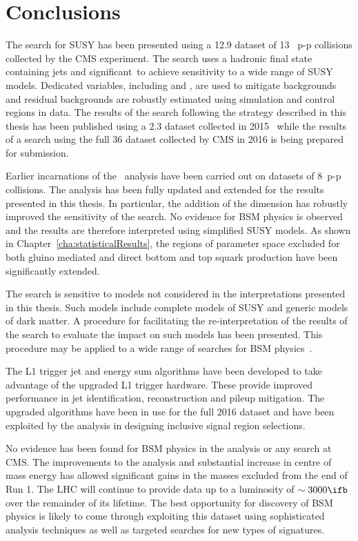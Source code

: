 \chapter{Conclusions}

The \alphat search for SUSY has been presented using a 12.9 \ifb 
dataset of 13 \TeV~p-p collisions collected by the CMS experiment. 
The search uses a hadronic final state containing jets and 
significant~\met to achieve sensitivity to a wide range of SUSY
models. Dedicated variables, including \alphat and \bdphi, are used 
to mitigate backgrounds and residual backgrounds 
are robustly estimated using simulation and control regions in data.
The results of the \alphat search following the strategy
described in this thesis has been published using 
a 2.3 \ifb dataset collected in 2015~\cite{alphat2015} while the results 
of a search using the full 36 \ifb dataset collected by CMS in 2016 
is being prepared for submission.

Earlier incarnations of the \alphat~analysis have been carried out
on datasets of 8\TeV~p-p collisions. The analysis has been
fully updated and extended for the results presented in this thesis. 
In particular, the addition of the \mht dimension has robustly improved the sensitivity of the search. 
No evidence for BSM physics is observed and the results are 
therefore interpreted using simplified SUSY models. As shown in Chapter~\ref{cha:statisticalResults},
the regions of parameter space excluded for both gluino mediated 
and direct bottom and top squark production have been 
significantly extended.

The \alphat search is sensitive to models not considered in the
interpretations presented in this thesis. Such models include 
complete models of SUSY and generic models of dark matter. 
A procedure for facilitating the re-interpretation of the results of the search to evaluate the 
impact on such models has been presented. This procedure 
may be applied to a wide range of searches for BSM physics~\cite{simp-lik}.

The L1 trigger jet and energy sum algorithms have been
developed to take advantage of the upgraded L1 trigger hardware.
These provide improved performance in jet identification, 
reconstruction and pileup mitigation. The upgraded algorithms have
been in use for the full 2016 dataset and have been exploited
by the \alphat analysis in designing inclusive signal region selections.

No evidence has been found for BSM physics in the \alphat analysis 
or any search at CMS. The improvements to the analysis and substantial
increase in centre of mass energy has allowed significant gains in
the masses excluded from the end of Run 1. The LHC will continue 
to provide data up to a luminosity of $\sim 3000 \ifb$ over the 
remainder of its lifetime. The best opportunity for discovery of 
BSM physics is likely to come through exploiting this dataset 
using sophisticated analysis techniques as well as targeted searches 
for new types of signatures.

